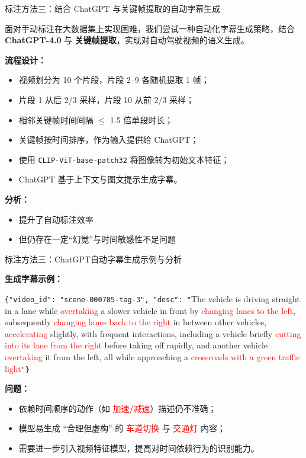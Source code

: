 \documentclass[serif]{beamer}
\begin{document}
\begin{frame}{标注方法三：结合 ChatGPT 与关键帧提取的自动字幕生成}

面对手动标注在大数据集上实现困难，我们尝试一种自动化字幕生成策略，结合 \textbf{ChatGPT-4.0} 与 \textbf{关键帧提取}，实现对自动驾驶视频的语义生成。

\vspace{0.6em}
\textbf{流程设计：}

\begin{itemize}
  \item 视频划分为 10 个片段，片段 2–9 各随机提取 1 帧；
  \item 片段 1 从后 2/3 采样，片段 10 从前 2/3 采样；
  \item 相邻关键帧时间间隔 $\leq$ 1.5 倍单段时长；
  \item 关键帧按时间排序，作为输入提供给 ChatGPT；
  \item 使用 \texttt{CLIP-ViT-base-patch32} 将图像转为初始文本特征；
  \item ChatGPT 基于上下文与图文提示生成字幕。
\end{itemize}

\textbf{分析：}
\begin{itemize}
\item 提升了自动标注效率
\item 但仍存在一定“幻觉”与时间敏感性不足问题
\end{itemize}

\end{frame}

\begin{frame}{标注方法三：ChatGPT自动字幕生成示例与分析}

\textbf{生成字幕示例：}

\vspace{0.3em}
\texttt{\{"video\_id": "scene-000785-tag-3", "desc": "}The vehicle is driving straight in a lane while \textcolor{red}{overtaking} a slower vehicle in front by \textcolor{red}{changing lanes to the left}, subsequently \textcolor{red}{changing lanes back to the right} in between other vehicles, \textcolor{red}{accelerating} slightly, with frequent interactions, including a vehicle briefly \textcolor{red}{cutting into its lane from the right} before taking off rapidly, and another vehicle \textcolor{red}{overtaking} it from the left, all while approaching a \textcolor{red}{crossroads with a green traffic light}\texttt{"\}}

\vspace{1em}
\textbf{问题：}

\begin{itemize}
  \item 依赖时间顺序的动作（如 \textcolor{red}{加速}/\textcolor{red}{减速}）描述仍不准确；
  \item 模型易生成 “合理但虚构” 的 \textcolor{red}{车道切换} 与 \textcolor{red}{交通灯} 内容；
  \item 需要进一步引入视频特征模型，提高对时间依赖行为的识别能力。
\end{itemize}

\end{frame}
\end{document}
